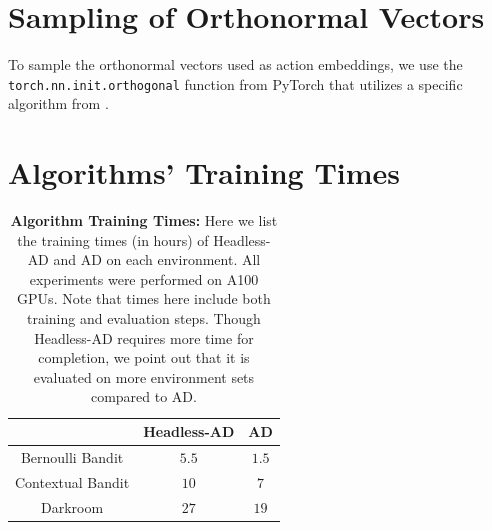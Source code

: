 \documentclass{article}
\theoremstyle{plain}
\theoremstyle{definition}
\theoremstyle{remark}
\begin{document}
\section{Sampling of Orthonormal Vectors}
\label{appendix:orthonormal_vectors}
To sample the orthonormal vectors used as action embeddings, we use the \texttt{torch.nn.init.orthogonal} function from PyTorch \citep{NEURIPS2019_9015} that utilizes a specific algorithm from \citet{saxe2013exact}.
\section{Algorithms' Training Times}
\begin{table}[h]
    \caption{\textbf{Algorithm Training Times:} Here we list the training times (in hours) of Headless-AD and AD on each environment. All experiments were performed on A100 GPUs. Note that times here include both training and evaluation steps. Though Headless-AD requires more time for completion, we point out that it is evaluated on more environment sets compared to AD.}
    \label{tab:algo_training_times}
    \centering
    \begin{tabular}{c|c|c}
         & Headless-AD & AD \\
        \hline
        Bernoulli Bandit & $5.5$ & $1.5$ \\
        Contextual Bandit & $10$ & $7$ \\
        Darkroom & $27$ & $19$ \\
    \end{tabular}
\end{table}
\end{document}

